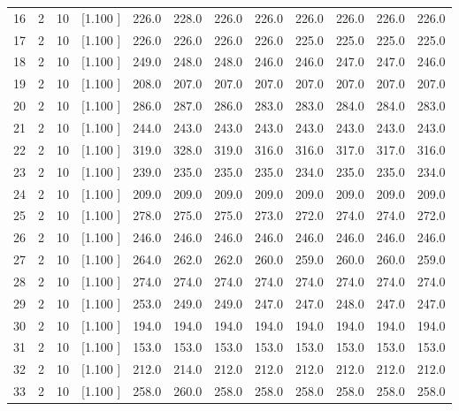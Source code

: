 \documentclass[12pt,a4paper]{article}
\begin{document}
\begin{center}
{\begin{tabular}{r r r r r r r r r r r r}
  16&  2& 10&[1.100     ]&   226.0&   228.0&   226.0&   226.0&   226.0&   226.0&   226.0&   226.0\\[-0.02in]
  17&  2& 10&[1.100     ]&   226.0&   226.0&   226.0&   226.0&   225.0&   225.0&   225.0&   225.0\\[-0.02in]
  18&  2& 10&[1.100     ]&   249.0&   248.0&   248.0&   246.0&   246.0&   247.0&   247.0&   246.0\\[-0.02in]
  19&  2& 10&[1.100     ]&   208.0&   207.0&   207.0&   207.0&   207.0&   207.0&   207.0&   207.0\\[-0.02in]
  20&  2& 10&[1.100     ]&   286.0&   287.0&   286.0&   283.0&   283.0&   284.0&   284.0&   283.0\\[-0.02in]
  21&  2& 10&[1.100     ]&   244.0&   243.0&   243.0&   243.0&   243.0&   243.0&   243.0&   243.0\\[-0.02in]
  22&  2& 10&[1.100     ]&   319.0&   328.0&   319.0&   316.0&   316.0&   317.0&   317.0&   316.0\\[-0.02in]
  23&  2& 10&[1.100     ]&   239.0&   235.0&   235.0&   235.0&   234.0&   235.0&   235.0&   234.0\\[-0.02in]
  24&  2& 10&[1.100     ]&   209.0&   209.0&   209.0&   209.0&   209.0&   209.0&   209.0&   209.0\\[-0.02in]
  25&  2& 10&[1.100     ]&   278.0&   275.0&   275.0&   273.0&   272.0&   274.0&   274.0&   272.0\\[-0.02in]
  26&  2& 10&[1.100     ]&   246.0&   246.0&   246.0&   246.0&   246.0&   246.0&   246.0&   246.0\\[-0.02in]
  27&  2& 10&[1.100     ]&   264.0&   262.0&   262.0&   260.0&   259.0&   260.0&   260.0&   259.0\\[-0.02in]
  28&  2& 10&[1.100     ]&   274.0&   274.0&   274.0&   274.0&   274.0&   274.0&   274.0&   274.0\\[-0.02in]
  29&  2& 10&[1.100     ]&   253.0&   249.0&   249.0&   247.0&   247.0&   248.0&   247.0&   247.0\\[-0.02in]
  30&  2& 10&[1.100     ]&   194.0&   194.0&   194.0&   194.0&   194.0&   194.0&   194.0&   194.0\\[-0.02in]
  31&  2& 10&[1.100     ]&   153.0&   153.0&   153.0&   153.0&   153.0&   153.0&   153.0&   153.0\\[-0.02in]
  32&  2& 10&[1.100     ]&   212.0&   214.0&   212.0&   212.0&   212.0&   212.0&   212.0&   212.0\\[-0.02in]
  33&  2& 10&[1.100     ]&   258.0&   260.0&   258.0&   258.0&   258.0&   258.0&   258.0&   258.0\\[-0.02in]

\end{tabular}}
\end{center}
\end{document}

